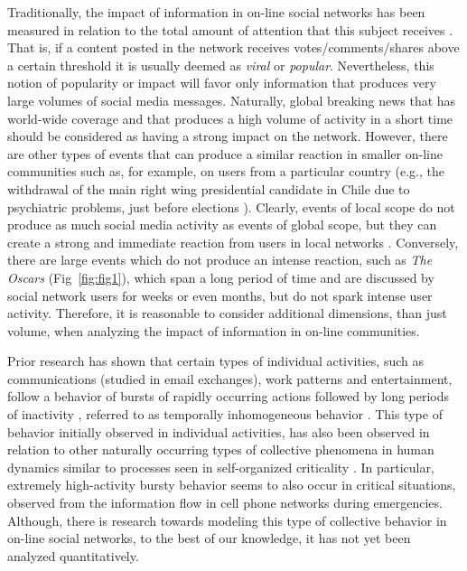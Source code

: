 Traditionally, the impact of information in on-line social networks has been
measured in relation to the total amount of attention that this subject receives
\cite{berger2012makes,iribarren2011branching,guerini2011exploring,mills2012virality,gaugaz2012predicting}.
That is, if a content posted in the network receives
votes/comments/shares above a certain threshold it is usually deemed as {\em viral} or
{\em popular}. Nevertheless, this
notion of popularity or impact will favor only information that produces very large
volumes of social media messages. 
Naturally, global breaking news that has world-wide coverage and that produces a high volume of
activity in a short time should be considered as
having a strong impact on the network.  However, there are other types of events
that can produce a similar reaction in smaller on-line communities
such as, for example, on users from a particular country
(e.g., the
withdrawal of the main right wing presidential candidate in Chile due
to psychiatric problems, just before
elections \cite{chile_elections}).
Clearly, events of local scope do not produce as much social media
activity as events of global scope, but they can create a strong and
immediate reaction from users in local networks \cite{ReisBOPKA15}. Conversely,
there are large events which do not produce an intense reaction, such as
{\em The Oscars} (Fig~\ref{fig:fig1}), which span a long
period of time and are discussed by social network users for weeks or
even months, but do not spark intense user activity. Therefore, it is reasonable to consider additional dimensions,
than just volume, when analyzing the impact of information in on-line communities.  

Prior research has shown that certain types of individual activities,
such as communications (studied in email exchanges), work patterns and
entertainment, follow a behavior of bursts of rapidly occurring
actions followed by long periods of inactivity
\cite{barabasi2005origin}, referred to as {temporally inhomogeneous}
behavior \cite{karsai2012universal}.  This type of behavior initially
observed in individual activities, has also been observed in relation
to other naturally occurring types of collective phenomena in human
dynamics similar to processes seen in self-organized criticality
\cite{karsai2012universal}.  In particular, extremely high-activity
bursty behavior seems to also occur in critical situations, observed
from the information flow in cell phone networks during
emergencies\cite{gao2014quantifying}.  Although, there is research
towards modeling this type of collective behavior
\cite{yan2013information} in on-line social networks, to the best of
our knowledge, it has not yet been analyzed quantitatively.


